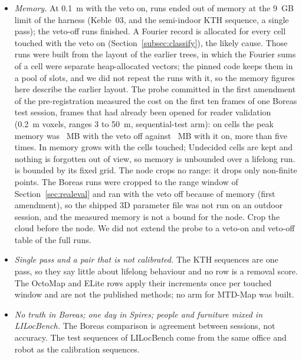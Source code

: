 \begin{itemize}
  \item \emph{Memory.} At 0.1~m with the veto on, \PtFailAll{} runs ended out of memory at the 9~GB limit of the harness (Keble~03, and the semi-indoor KTH sequence, a single pass); the veto-off runs finished. A Fourier record is allocated for every cell touched with the veto on (Section~\ref{subsec:classify}), the likely cause. Those runs were built from the layout of the earlier trees, in which the Fourier sums of a cell were separate heap-allocated vectors; the pinned code keeps them in a pool of slots, and we did not repeat the runs with it, so the memory figures here describe the earlier layout. The probe committed in the first amendment of the pre-registration measured the cost on the first ten frames of one Boreas test session, frames that had already been opened for reader validation (0.2~m voxels, ranges 3 to 50~m, sequential-test arm): on \PtProbeCells{} cells the peak memory was \PtProbeOff~MB with the veto off against \PtProbeOn~MB with it on, more than five times. In  memory grows with the cells touched; Undecided cells are kept and nothing is forgotten out of view, so memory is unbounded over a lifelong run.  is bounded by its fixed grid. The node crops no range: it drops only non-finite points. The Boreas runs were cropped to the range window of Section~\ref{sec:realeval} and ran with the veto off because of memory (first amendment), so the shipped 3D parameter file was not run on an outdoor session, and the measured memory is not a bound for the node. Crop the cloud before the node. We did not extend the probe to a veto-on and veto-off table of the full runs.
  \item \emph{Single pass and a pair that is not calibrated.} The KTH sequences are one pass, so they say little about lifelong behaviour and no row is a removal score. The OctoMap and ELite rows apply their increments once per touched window and are not the published methods; no arm for MTD-Map was built.
  \item \emph{No truth in Boreas; one day in Spires; people and furniture mixed in LILocBench.} The Boreas comparison is agreement between sessions, not accuracy. The test sequences of LILocBench come from the same office and robot as the calibration sequences.

\end{itemize}
